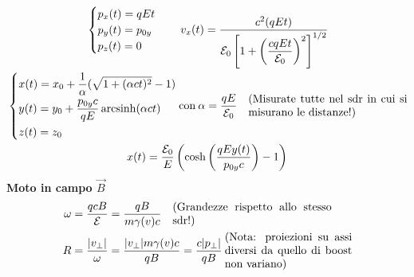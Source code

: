 \documentclass{article}
\DeclareMathOperator{\arcsinh}{arcsinh}
\begin{document}
\begin{minipage}[t]{.5\textwidth}
\begin{align*}
    \span
    \begin{cases}
    p_x(t) = qEt\\
    p_y(t) = p_{0y}\\
    p_z(t) = 0
    \end{cases} \quad v_x(t) = \frac{c^2 (qEt)}{\displaystyle \mathcal{E}_0 \left [
    1+ \left(\frac{cqEt}{\mathcal{E}_0}\right )^2
    \right ]^{1/2}}\\
    \span
    \begin{dcases}
    x(t) = x_0 + \frac{1}{\alpha}(\sqrt{1+(\alpha c t)^2} -1)\\
    y(t) = y_0 + \frac{p_{0y}c}{qE}\arcsinh(\alpha c t)\\
    z(t) = z_0
    \end{dcases} \text{con} \> \alpha = \frac{qE}{\mathcal{E}_0} \quad \parbox{5cm}{(Misurate tutte nel sdr in cui si misurano le distanze!)}\\
    x(t) \span= \frac{\mathcal{E}_0}{E}\left (\cosh \left (\frac{qE y(t)}{p_{0y}c} \right )-1 \right )
\end{align*}
{\Large \textbf{Moto in campo $\vec{B}$}}
\begin{align*}
    \omega &= \frac{qcB}{\mathcal{E}} = \frac{qB}{m\gamma(v)c} \quad \parbox{5cm}{(Grandezze rispetto allo stesso sdr!)}\\
    R &= \frac{|v_\perp|}{\omega} = \frac{|v_\perp|m\gamma(v)c}{qB} = \frac{c|p_\perp|}{qB} \> \parbox{4cm}{(Nota: proiezioni su assi diversi da quello di boost non variano)}
\end{align*}
\raggedright
\end{minipage}%
\end{document}
